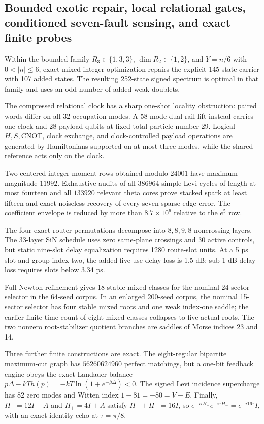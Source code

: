 \subsection{Bounded exotic repair, local relational gates, conditioned seven-fault sensing, and exact finite probes}
Within the bounded family \(R_3\in\{1,3,\bar3\}\), \(\dim R_2\in\{1,2\}\), and \(Y=n/6\) with \(0<|n|\le6\), exact mixed-integer optimization repairs the explicit 145-state carrier with 107 added states.  The resulting 252-state signed spectrum is optimal in that family and uses an odd number of added weak doublets.

The compressed relational clock has a sharp one-shot locality obstruction: paired words differ on all 32 occupation modes.  A 58-mode dual-rail lift instead carries one clock and 28 payload qubits at fixed total particle number 29.  Logical \(H,S,\mathrm{CNOT}\), clock exchange, and clock-controlled payload operations are generated by Hamiltonians supported on at most three modes, while the shared reference acts only on the clock.

Two centered integer moment rows obtained modulo \(24001\) have maximum magnitude \(11992\).  Exhaustive audits of all \(386964\) simple Levi cycles of length at most fourteen and all \(133920\) relevant theta cores prove stacked spark at least fifteen and exact noiseless recovery of every seven-sparse edge error.  The coefficient envelope is reduced by more than \(8.7\times10^6\) relative to the \(e^5\) row.

The four exact router permutations decompose into \(8,8,9,8\) noncrossing layers.  The 33-layer SiN schedule uses zero same-plane crossings and 30 active controls, but static nine-slot delay equalization requires 1280 route-slot units.  At a 5 ps slot and group index two, the added five-use delay loss is 1.5 dB; sub-1 dB delay loss requires slots below 3.34 ps.

Full Newton refinement gives 18 stable mixed classes for the nominal 24-sector selector in the 64-seed corpus.  In an enlarged 200-seed corpus, the nominal 15-sector selector has four stable mixed roots and one weak index-one saddle; the earlier finite-time count of eight mixed classes collapses to five actual roots.  The two nonzero root-stabilizer quotient branches are saddles of Morse indices 23 and 14.

Three further finite constructions are exact.  The eight-regular bipartite maximum-cut graph has \(56260624960\) perfect matchings, but a one-bit feedback engine obeys the exact Landauer balance \(p\Delta-kT h(p)=-kT\ln(1+e^{-\beta\Delta})<0\).  The signed Levi incidence supercharge has 82 zero modes and Witten index \(1-81=-80=V-E\).  Finally, \(H_-=12I-A\) and \(H_+=4I+A\) satisfy \(H_-+H_+=16I\), so \(e^{-i\tau H_+}e^{-i\tau H_-}=e^{-i16\tau}I\), with an exact identity echo at \(\tau=\pi/8\).

